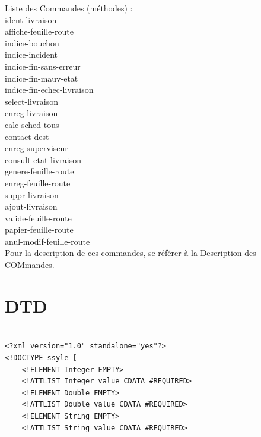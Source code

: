 \documentclass{report}
\begin{document}
\begin{appendices}
Liste des Commandes (méthodes) :\\
ident-livraison\\
affiche-feuille-route\\
indice-bouchon\\
indice-incident\\
indice-fin-sans-erreur\\
indice-fin-mauv-etat\\
indice-fin-echec-livraison\\
select-livraison\\
enreg-livraison\\
calc-sched-tous\\
contact-dest\\
enreg-superviseur\\
consult-etat-livraison\\
genere-feuille-route\\
enreg-feuille-route\\
suppr-livraison\\
ajout-livraison\\
valide-feuille-route\\
papier-feuille-route\\
anul-modif-feuille-route\\
Pour la description de ces commandes, se référer à la \hyperlink{labDCOM}{Description des COMmandes}.\\




\chapter{DTD}\label{labDTD}

\begin{verbatim}

<?xml version="1.0" standalone="yes"?>
<!DOCTYPE ssyle [
    <!ELEMENT Integer EMPTY>
    <!ATTLIST Integer value CDATA #REQUIRED>
    <!ELEMENT Double EMPTY>
    <!ATTLIST Double value CDATA #REQUIRED>
    <!ELEMENT String EMPTY>
    <!ATTLIST String value CDATA #REQUIRED>


\end{verbatim}
\end{appendices}
\end{document}
